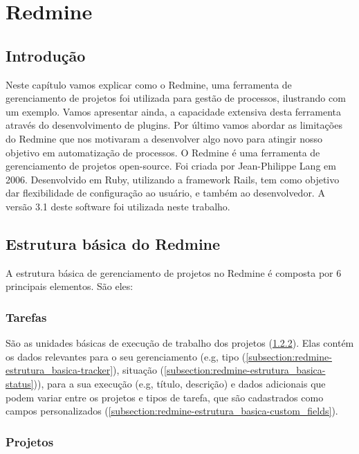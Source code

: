 \chapter{Redmine}\label{chp:redmine}

\section{Introdução}\label{sec:redmine-introducao}
Neste capítulo vamos explicar como o Redmine, uma ferramenta de gerenciamento de projetos foi utilizada para gestão de processos, ilustrando com um exemplo. Vamos apresentar ainda, a capacidade extensiva desta ferramenta através do desenvolvimento de plugins. Por último vamos abordar as limitações do Redmine que nos motivaram a desenvolver algo novo para atingir nosso objetivo em automatização de processos.
O Redmine\cite{redmine} é uma ferramenta de gerenciamento de projetos open-source. Foi criada por Jean-Philippe Lang em 2006. Desenvolvido em Ruby, utilizando a framework Rails, tem como objetivo dar flexibilidade de configuração ao usuário, e também ao desenvolvedor. A versão 3.1 deste software foi utilizada neste trabalho.


\section{Estrutura básica do Redmine}\label{sec:redmine-estrutura_basica}

A estrutura básica de gerenciamento de projetos no Redmine é composta por 6 principais elementos. São eles:

\subsection{Tarefas}\label{subsection:redmine-estrutura_basica-tarefa}

São as unidades básicas de execução de trabalho dos projetos (\ref{subsection:redmine-estrutura_basica-projeto}). Elas contém os dados relevantes para o seu gerenciamento (e.g, tipo (\ref{subsection:redmine-estrutura_basica-tracker}), situação (\ref{subsection:redmine-estrutura_basica-status})), para a sua execução (e.g, título, descrição) e dados adicionais que podem variar entre os projetos e tipos de tarefa, que são cadastrados como campos personalizados (\ref{subsection:redmine-estrutura_basica-custom_fields}).  

\subsection{Projetos}\label{subsection:redmine-estrutura_basica-projeto}

